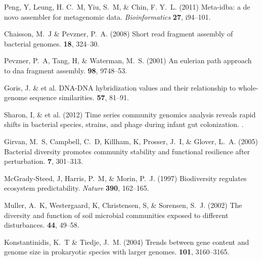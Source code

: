 \documentclass{pnastwo}
\begin{document}
\begin{article}
\begin{thebibliography}{10}
 Peng, Y, Leung, H. C.~M, Yiu, S.~M, \& Chin, F. Y.~L.
\newblock (2011) Meta-idba: a de novo assembler for metagenomic data. \newblock
{\em Bioinformatics} {\bf 27}, i94--101.

 Chaisson, M.~J \& Pevzner, P.~A. \newblock (2008)
Short read fragment assembly of bacterial genomes.  {\bf 18}, 324--30.

 Pevzner, P.~A, Tang, H, \& Waterman, M.~S. \newblock
(2001) An eulerian path approach to dna fragment assembly.  {\bf 98}, 9748--53.

 Goris, J. \& et al. DNA-DNA hybridization values and their relationship to whole-genome
sequence similarities.  {\bf 57}, 81--91.

 Sharon, I, \& et al. \newblock (2012) {Time series community
genomics analysis reveals rapid shifts in bacterial species, strains, and phage
during infant gut colonization}. .


 Girvan, M.~S, Campbell, C.~D, Killham, K, Prosser, J.~I,
\& Glover, L.~A. \newblock (2005) {Bacterial diversity promotes community
stability and functional resilience after perturbation.}  {\bf 7}, 301--313.

 McGrady-Steed, J, Harris, P.~M, \& Morin, P.~J.
\newblock (1997) {Biodiversity regulates ecosystem predictability}. \newblock
{\em Nature} {\bf 390}, 162--165.

 Muller, A.~K, Westergaard, K, Christensen, S, \&
Sorensen, S.~J. \newblock (2002) {The diversity and function of soil microbial
communities exposed to different disturbances.}  {\bf 44}, 49--58.

 Konstantinidis, K.~T \& Tiedje, J.~M. \newblock
(2004) {Trends between gene content and genome size in prokaryotic species with
larger genomes}.  {\bf 101}, 3160--3165.

\end{thebibliography} \end{article}
\end{document}
